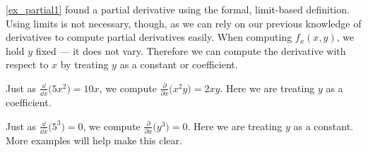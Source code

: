 \autoref{ex_partial1} found a partial derivative using the formal, limit-based definition. Using limits is not necessary, though, as we can rely on our previous knowledge of derivatives to compute partial derivatives easily. When computing $f_x(x,y)$, we hold $y$ fixed --- it does not vary. Therefore we can compute the derivative with respect to $x$ by treating $y$ as a constant or coefficient. 

Just as $\frac{\dd}{\dd x}\bigl(5x^2\bigr) = 10x$, we compute $\frac{\partial}{\partial x}\bigl(x^2y\bigr) = 2xy$. Here we are treating $y$ as a coefficient.

Just as $\frac{\dd}{\dd x}\bigl(5^3\bigr) = 0$, we compute $\frac{\partial}{\partial x}\bigl(y^3\bigr) = 0.$ Here we are treating $y$ as a constant. More examples will help make this clear.

